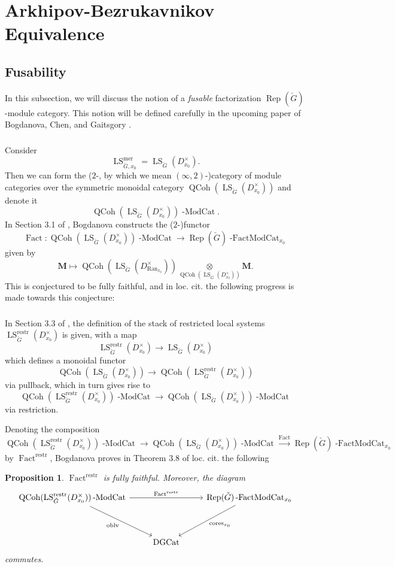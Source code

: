 \documentclass[10pt]{amsart}
\newtheorem{prop}[subsubsection]{Proposition}
\theoremstyle{remark}
\newcommand{\on}[1]{\operatorname{#1}}
\newcommand{\QCoh}{\on{QCoh}}
\newcommand{\Gcheck}{\check{G}}
\newcommand{\Ran}{\on{Ran}}
\newcommand{\sssec}[1]{\subsubsection{}}
\begin{document}
\section{Arkhipov-Bezrukavnikov Equivalence} \label{Section AB}

\subsection{Fusability} \label{Fusability}
In this subsection, we will discuss the notion of a \emph{fusable} factorization $\on{Rep}(\Gcheck)$-module category. This notion will be defined carefully in the upcoming paper of Bogdanova, Chen, and Gaitsgory \cite{BCG}.

\sssec{}
Consider
$$
\on{LS}_{\Gcheck, x_0}^{\on{mer}} = \on{LS}_{\Gcheck}(D_{x_0}^{\times}).
$$
Then we can form the ($2$-, by which we mean $(\infty, 2)$-)category of module categories over the symmetric monoidal category $\QCoh(\on{LS}_{\Gcheck}(D_{x_0}^{\times}))$ and denote it
$$
\QCoh(\on{LS}_{\Gcheck}(D_{x_0}^{\times}))\on{-ModCat}.
$$
In Section 3.1 of \cite{Katia}, Bogdanova constructs the ($2$-)functor
$$
\on{Fact} : \QCoh(\on{LS}_{\Gcheck}(D_{x_0}^{\times}))\on{-ModCat} \longrightarrow \on{Rep}(\Gcheck)\on{-FactModCat}_{x_0}
$$
given by
$$
\boldsymbol{M} \mapsto \QCoh(\on{LS}_{\Gcheck}(D_{\Ran_{x_0}}^{\times})) \underset{\QCoh(\on{LS}_{\Gcheck}(D_{x_0}^{\times}))}{\otimes} \boldsymbol{M}.
$$
This is conjectured to be fully faithful, and in loc. cit. the following progress is made towards this conjecture:

\sssec{}
In Section 3.3 of \cite{Katia}, the definition of the stack of restricted local systems $\on{LS}_{\Gcheck}^{\on{restr}}(D_{x_0}^{\times})$ is given, with a map
$$
\on{LS}_{\Gcheck}^{\on{restr}}(D_{x_0}^{\times}) \longrightarrow \on{LS}_{\Gcheck}(D_{x_0}^{\times})
$$
which defines a monoidal functor
$$
\QCoh(\on{LS}_{\Gcheck}(D_{x_0}^{\times})) \longrightarrow \QCoh(\on{LS}_{\Gcheck}^{\on{restr}}(D_{x_0}^{\times}))
$$
via pullback, which in turn gives rise to
$$
\QCoh(\on{LS}_{\Gcheck}^{\on{restr}}(D_{x_0}^{\times}))\on{-ModCat} \longrightarrow \QCoh(\on{LS}_{\Gcheck}(D_{x_0}^{\times}))\on{-ModCat}
$$
via restriction.

Denoting the composition
$$
\QCoh(\on{LS}_{\Gcheck}^{\on{restr}}(D_{x_0}^{\times}))\on{-ModCat} \longrightarrow \QCoh(\on{LS}_{\Gcheck}(D_{x_0}^{\times}))\on{-ModCat} \overset{\on{Fact}}{\longrightarrow} \on{Rep}(\Gcheck)\on{-FactModCat}_{x_0} 
$$
by $\on{Fact}^{\on{restr}}$, Bogdanova proves in Theorem 3.8 of loc. cit. the following
\begin{prop}
    $\on{Fact}^{\on{restr}}$ is fully faithful. Moreover, the diagram
    $$
    \begin{tikzcd}
        {\QCoh(\on{LS}_{\Gcheck}^{\on{restr}}(D_{x_0}^{\times}))\on{-ModCat}} && {\on{Rep}(\Gcheck)\on{-FactModCat}_{x_0}} \\
	\\
	& {\on{DGCat}}
	\arrow["{\on{Fact}^{\on{restr}}}", from=1-1, to=1-3]
	\arrow["{\on{oblv}}"', from=1-1, to=3-2]
	\arrow["{\on{cores}_{x_0}}", from=1-3, to=3-2]
    \end{tikzcd}
    $$
    commutes.
\end{prop}
\end{document}
